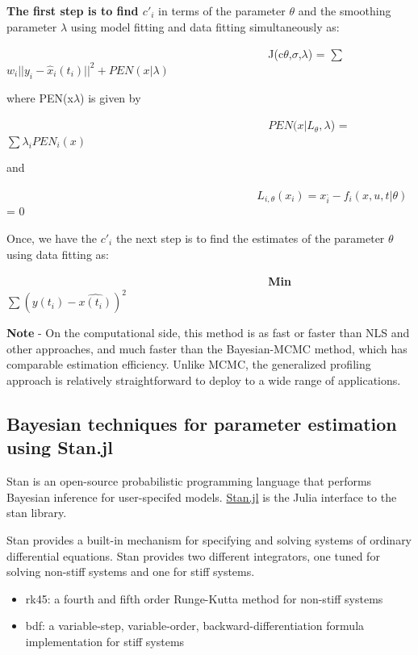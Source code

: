 \documentclass[11pt]{article}
\providecommand{\tightlist}{%
      \setlength{\itemsep}{0pt}\setlength{\parskip}{0pt}}
\begin{document}
\textbf{The first step is to find \(c'_{i}\)} in terms of the parameter
\(\theta\) and the smoothing parameter \(\lambda\) using model fitting
and data fitting simultaneously as:

~~~~~~~~~~ ~~~~~~~~~~~~~~~~~~~~~~~~~~~~~~~~~~~
J(c\textbar{}\(\theta\),\(\sigma\),\(\lambda\)) =
\(\sum\)\(w_{i}||y_{i}-\hat{x}_{i}(t_{i})||^{2} + PEN(x|\lambda)\)

    where PEN(x\textbar{}\(\lambda\)) is given by

~~~~~~~~~~ ~~~~~~~~~~~~~~~~~~~~~~~~~~~~~~~~~~~
\(PEN(x|L_{\theta},\lambda\)) = \(\sum\lambda_{i}PEN_{i}(x)\)

and

~~~~~~~~~~ ~~~~~~~~~~~~~~~~~~~~~~~~~~~~~~~~~
\(L_{i,\theta}(x_{i}) = x_{i}^{.} - f_{i}(x,u,t|\theta)\) = 0

    Once, we have the \(c'_{i}\) the next step is to find the estimates of
the parameter \(\theta\) using data fitting as:

~~~~~~~~~~ ~~~~~~~~~~~~~~~~~~~~~~~~~~~~~~~~~~~ \textbf{Min}
\(\sum(y(t_{i})-\hat{x(t_{i})})^{2}\)

\textbf{Note} - On the computational side, this method is as fast or
faster than NLS and other approaches, and much faster than the
Bayesian-MCMC method, which has comparable estimation efficiency. Unlike
MCMC, the generalized profiling approach is relatively straightforward
to deploy to a wide range of applications.

    \subsection{Bayesian techniques for parameter estimation using
Stan.jl}\label{bayesian-techniques-for-parameter-estimation-using-stan.jl}

Stan is an open-source probabilistic programming language that performs
Bayesian inference for user-specifed models.
\href{https://github.com/goedman/Stan.jl}{Stan.jl} is the Julia
interface to the stan library.

Stan provides a built-in mechanism for specifying and solving systems of
ordinary differential equations. Stan provides two different
integrators, one tuned for solving non-stiff systems and one for stiff
systems.

\begin{itemize}
\tightlist
\item
  rk45: a fourth and fifth order Runge-Kutta method for non-stiff
  systems
\item
  bdf: a variable-step, variable-order, backward-differentiation formula
  implementation for stiff systems
\end{itemize}
\end{document}
